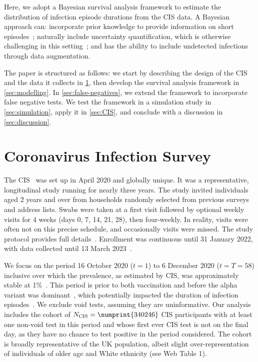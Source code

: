 \documentclass[referee,useAMS,usenatbib]{biom}
\newcommand{\Ncis}{N_\text{CIS}}
\begin{document}
Here, we adopt a Bayesian survival analysis framework to estimate the distribution of infection episode durations from the CIS data.
A Bayesian approach can: incorporate prior knowledge to provide information on short episodes~\citep{caoBias}; naturally include uncertainty quantification, which is otherwise challenging in this setting~\citep{sunStatistical,dengNonparametric}; and has the ability to include undetected infections through data augmentation.

The paper is structured as follows: we start by describing the design of the CIS and the data it collects in \cref{sec:data}, then develop the survival analysis framework in \cref{sec:modelling}.
In \cref{sec:false-negatives}, we extend the framework to incorporate false negative tests.
We test the framework in a simulation study in \cref{sec:simulation}, apply it in \cref{sec:CIS}, and conclude with a discussion in \cref{sec:discussion}.


\section{Coronavirus Infection Survey} \label{sec:data}

The CIS~\citep{CIS} was set up in April 2020 and globally unique.
It was a representative, longitudinal study running for nearly three years.
The study invited individuals aged 2 years and over from households randomly selected from previous surveys and address lists.
Swabs were taken at a first visit followed by optional weekly visits for 4 weeks (days 0, 7, 14, 21, 28), then four-weekly.
In reality, visits were often not on this precise schedule, and occasionally visits were missed.
The study protocol provides full details~\citep{cisProtocol}.
Enrollment was continuous until 31 January 2022, with data collected until 13 March 2023~\citep{weiRisk}. 

We focus on the period 16 October 2020 ($t=1$) to 6 December 2020 ($t=T=58$) inclusive over which the prevalence, as estimated by CIS, was approximately stable at 1\%~\citep{onsCISdec2020}.
This period is prior to both vaccination and before the alpha variant was dominant~\citep{lythgoeLineage}, which potentially impacted the duration of infection episodes~\citep{hakkiOnset,russellWithinhost}.
We exclude void tests, assuming they are uninformative.
Our analysis includes the cohort of $\Ncis = \numprint{340246}$ CIS participants with at least one non-void test in this period and whose first ever CIS test is not on the final day, as they have no chance to test positive in the period considered.
The cohort is broadly representative of the UK population, albeit slight over-representation of individuals of older age and White ethnicity (see Web Table 1).
\end{document}
